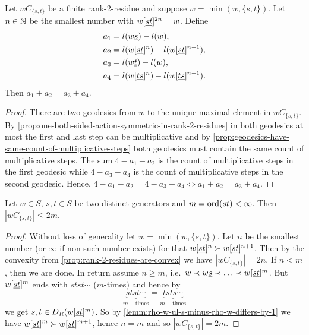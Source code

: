 \begin{prop}

	Let $wC_{\{s,t\}}$ be a finite rank-2-residue and suppose $w = \min(w,\{s,t\})$. Let $n \in \mathbb{N}$ be the smallest number with $w[\underline{s} \underline{t}]^{2n} = w$. Define
	\begin{align*}
		a_1 & = l(w \underline{s}) - l(w), \\
		a_2 & = l(w[\underline{s} \underline{t}]^{n}) - l(w[\underline{s} \underline{t}]^{n-1}), \\
		a_3 & = l(w \underline{t}) - l(w), \\
		a_4 & = l(w[\underline{t} \underline{s}]^{n}) - l(w[\underline{t} \underline{s}]^{n-1}).
	\end{align*}
	Then $a_1 + a_2 = a_3 + a_4$.

	\begin{proof}
		There are two geodesics from $w$ to the unique maximal element in $wC_{\{s,t\}}$. By \ref{prop:one-both-sided-action-symmetric-in-rank-2-residues} in both geodesics at most the first and last step can be multiplicative and by \ref{prop:geodesics-have-same-count-of-multiplicative-steps} both geodesics must contain the same count of multiplicative steps. The sum $4-a_1-a_2$ is the count of multiplicative steps in the first geodesic while $4-a_3-a_4$ is the count of multiplicative steps in the second geodesic. Hence, $4-a_1-a_2 = 4-a_3-a_4 \iff a_1+a_2 = a_3+a_4$.
	\end{proof}
\end{prop}

\begin{lemm}
	Let $w \in S$, $s,t \in S$ be two distinct generators and $m = \operatorname{ord}(st) < \infty$. Then $|wC_{\{s,t\}}| \leq 2m$.

	\begin{proof}
		Without loss of generality let $w = \min(w,\{s,t\})$. Let $n$ be the smallest number (or $\infty$ if non such number exists) for that $w[\underline{s} \underline{t}]^{n} \succ w[\underline{s} \underline{t}]^{n+1}$. Then by the convexity from \ref{prop:rank-2-residues-are-convex} we have $|wC_{\{s,t\}}| = 2n$. If $n < m$, then we are done. In return assume $n \geq m$, i.e.\ $w \prec w \underline{s} \prec \ldots \prec w[\underline{s} \underline{t}]^{m}$. But $w[\underline{s} \underline{t}]^{m}$ ends with $stst \cdots$ ($m$-times) and hence by
		$$ \underbrace{stst \cdots}_{m-\textrm{times}} = \underbrace{tsts \cdots}_{m-\textrm{times}} $$
		we get $s,t \in D_R(w[\underline{s} \underline{t}]^{m})$. So by \ref{lemm:rho-w-ul-s-minus-rho-w-differs-by-1} we have $w[\underline{s} \underline{t}]^{m} \succ w[\underline{s} \underline{t}]^{m+1}$, hence $n = m$ and so $|wC_{\{s,t\}}| = 2m$.
	\end{proof}
\end{lemm}

